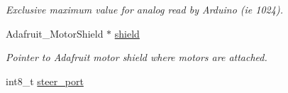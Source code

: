 \begin{DoxyCompactItemize}
\begin{DoxyCompactList}\small\item\em Exclusive maximum value for analog read by Arduino (ie 1024). \end{DoxyCompactList}\item 
Adafruit\+\_\+\+Motor\+Shield $\ast$ \hyperlink{structmodule__assembly_a803c57702021d99f89c3b393aabf3a50}{shield}
\begin{DoxyCompactList}\small\item\em Pointer to Adafruit motor shield where motors are attached. \end{DoxyCompactList}\item 
\hypertarget{structmodule__assembly_a01a262a82104991c2c81db87c625ae8e}{}int8\+\_\+t \hyperlink{structmodule__assembly_a01a262a82104991c2c81db87c625ae8e}{steer\+\_\+port}\label{structmodule__assembly_a01a262a82104991c2c81db87c625ae8e}


\end{DoxyCompactItemize}
